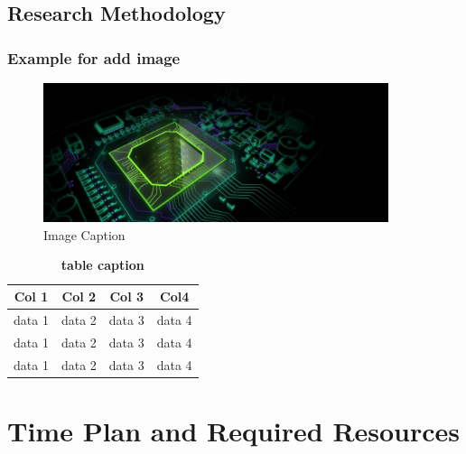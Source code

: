 \subsection{Research Methodology}
\subsubsection{Example for add image}

\begin{figure}[H]
	\begin{center}
		\includegraphics[width=0.9\textwidth]{01_chapters/01/figs/exsample.jpg}
	\end{center}
	\caption{Image Caption}
\end{figure}

\begin{table}[tb]
	\caption{\textbf{table caption}}
	\label{tb:sampletable}
	
	\begin{center}
		
		\begin{tabular}{|c|c|c|c|}
			\hline \textbf{Col 1} & \textbf{Col 2} & \textbf{Col 3} & \textbf{Col4}    \\
			
			\hline  data 1        & data 2         & data 3         & data 4           \\ 
			\hline  data 1        & data 2         & data 3         & data 4           \\ 
			\hline  data 1        & data 2         & data 3         & data 4           \\ 
			
			\hline 
		\end{tabular} 
		
	\end{center}
\end{table}


\section{Time Plan and Required Resources}



